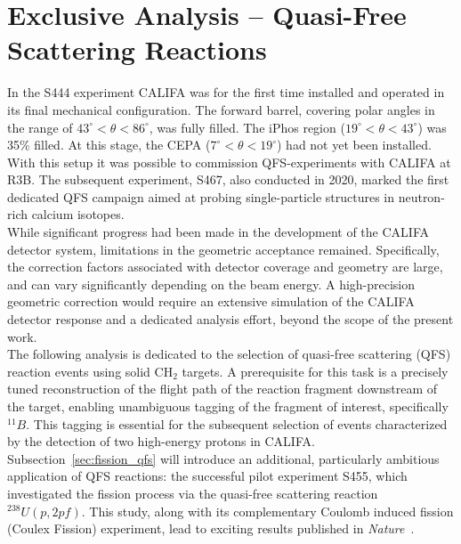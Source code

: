 \section{Exclusive Analysis -- Quasi-Free Scattering Reactions}\label{sec_analysis_qfs}
In the S444 experiment CALIFA was for the first time installed and operated in its final mechanical configuration. The forward barrel, covering polar angles in the range of $43^{\circ} < \theta< 86^{\circ}$, was fully filled. The iPhos region ($19^{\circ} < \theta < 43^{\circ}$) was 35\% filled. At this stage, the CEPA ($7^{\circ} < \theta < 19^{\circ}$) had not yet been installed.\\
With this setup it was possible to commission QFS-experiments  with CALIFA at R3B.
The subsequent experiment, S467, also conducted in 2020, marked the first dedicated QFS campaign aimed at probing single-particle structures in neutron-rich calcium isotopes.\\
While significant progress had been made in the development of the CALIFA detector system, limitations in the geometric acceptance remained. Specifically, the correction factors associated with detector coverage and geometry are large, and can vary significantly depending on the beam energy. A high-precision geometric correction would require an extensive simulation of the CALIFA detector response and a dedicated analysis effort, beyond the scope of the present work.\\
The following analysis is dedicated to the selection of quasi-free scattering (QFS) reaction events using solid CH$_2$ targets. A prerequisite for this task is a precisely tuned reconstruction of the flight path of the reaction fragment downstream of the target, enabling unambiguous tagging of the fragment of interest, specifically $^{11}B$. This tagging is essential for the subsequent selection of events characterized by the detection of two high-energy protons in CALIFA.\\
Subsection~\ref{sec:fission_qfs} will introduce an additional, particularly ambitious application of QFS reactions: the successful pilot experiment S455, which investigated the fission process via the quasi-free scattering reaction $^{238}U(p,2pf)$. This study, along with its complementary Coulomb induced fission (Coulex Fission) experiment, lead to exciting results published in \textit{Nature}~\cite{morfouace2025asymmetric}.


